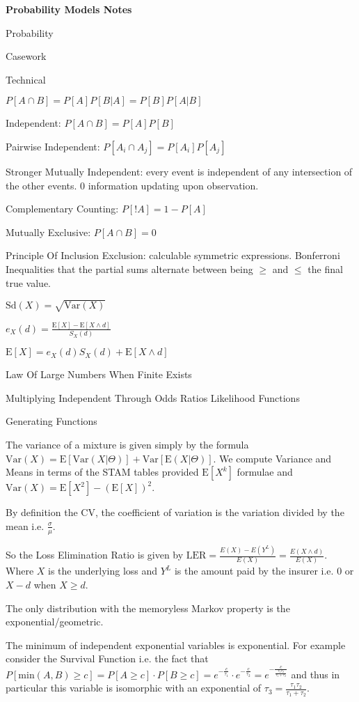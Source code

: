 \Large
\twocolumn

\textbf{Probability Models Notes}

Probability

Casework

Technical

$P[A \cap B]=P[A]P[B|A]=P[B]P[A|B]$

Independent: $P[A \cap B]=P[A]P[B]$

Pairwise Independent: $P[A_i \cap A_j]=P[A_i]P[A_j]$

Stronger Mutually Independent: every event is independent of any intersection of the other events. $0$ information updating upon observation.

Complementary Counting: $P[!A]=1-P[A]$

Mutually Exclusive: $P[A \cap B]=0$

Principle Of Inclusion Exclusion: calculable symmetric expressions. Bonferroni Inequalities that the partial sums alternate between being $\ge$ and $\le$ the final true value.

$\text{Sd}(X)=\sqrt{\text{Var}(X)}$

$e_X (d) = \frac{\text{E}[X] - \text{E}[X \wedge d]}{S_X (d)}$

$\text{E}[X]=e_X (d) S_X (d) + \text{E}[X \wedge d]$

Law Of Large Numbers When Finite Exists

Multiplying Independent Through Odds Ratios Likelihood Functions

Generating Functions

The variance of a mixture is given simply by the formula $\text{Var}(X)=\text{E}[\text{Var}(X | \Theta)]+\text{Var}[\text{E}(X | \Theta)]$. We compute Variance and Means in terms of the STAM tables provided $\text{E}[X^k]$ formulae and $\text{Var}(X)=\text{E}[X^2]-(\text{E}[X])^2$.

By definition the CV, the coefficient of variation is the variation divided by the mean i.e. $\frac{\sigma}{\mu}$.

So the Loss Elimination Ratio is given by $\text{LER} = \frac{E(X)-E(Y^L)}{E(X)} = \frac{E(X \wedge d)}{E(X)}$. Where $X$ is the underlying loss and $Y^L$ is the amount paid by the insurer i.e. $0$ or $X-d$ when $X \ge d$.

The only distribution with the memoryless Markov property is the exponential/geometric.

The minimum of independent exponential variables is exponential. For example consider the Survival Function i.e. the fact that $P[\text{min}(A,B) \ge c]=P[A \ge c] \cdot P[B \ge c]=e^{-\frac{c}{\tau_1}} \cdot e^{-\frac{c}{\tau_2}}=e^{-\frac{c}{\frac{\tau_1 \tau_2}{\tau_1+\tau_2}}}$ and thus in particular this variable is isomorphic with an exponential of $\tau_3=\frac{\tau_1 \tau_2}{\tau_1+\tau_2}$.

